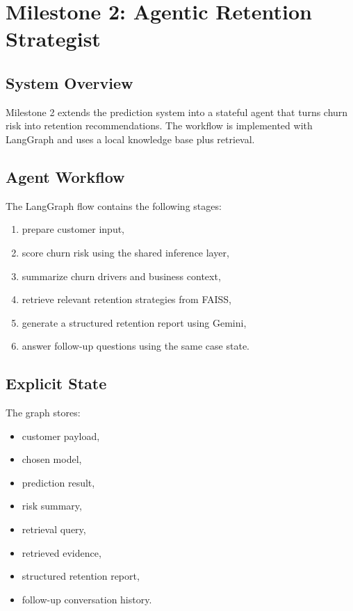 \documentclass[12pt]{article}
\begin{document}
\section{Milestone 2: Agentic Retention Strategist}

\subsection{System Overview}
Milestone 2 extends the prediction system into a stateful agent that turns churn risk into retention recommendations. The workflow is implemented with LangGraph and uses a local knowledge base plus retrieval.

\subsection{Agent Workflow}
The LangGraph flow contains the following stages:
\begin{enumerate}
    \item prepare customer input,
    \item score churn risk using the shared inference layer,
    \item summarize churn drivers and business context,
    \item retrieve relevant retention strategies from FAISS,
    \item generate a structured retention report using Gemini,
    \item answer follow-up questions using the same case state.
\end{enumerate}

\subsection{Explicit State}
The graph stores:
\begin{itemize}
    \item customer payload,
    \item chosen model,
    \item prediction result,
    \item risk summary,
    \item retrieval query,
    \item retrieved evidence,
    \item structured retention report,
    \item follow-up conversation history.
\end{itemize}
\end{document}
